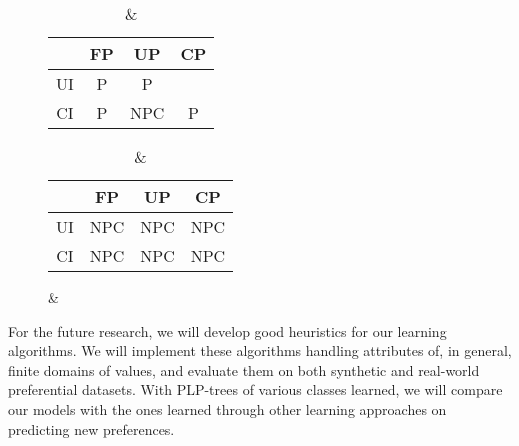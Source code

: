 \begin{table}[!ht]
	\centering
	\caption{Complexity results for passive learning problems}
  \begin{subfigure}[b]{0.45\textwidth}
		\centering
		\begin{tabular}[0.45\textwidth]{ | c | c | c | c | }
		  \hline
		     & FP & UP & CP \\
		  \hline
		  UI & P & P & \tit{NP}\\
		  \hline
		  CI & P & NPC & P  \\
		  \hline
		\end{tabular}
		\caption{}
		\label{tbl:cons_learn}
	\end{subfigure}%
  \begin{subfigure}[b]{0.45\textwidth}
		\centering
		\begin{tabular}[0.45\textwidth]{ | c | c | c | c | }
		  \hline
		     & FP & UP & CP \\
		  \hline
		  UI & NPC & NPC & NPC \\
		  \hline
		  CI & NPC & NPC & NPC \\
		  \hline
		\end{tabular}
		\caption{ \& }
		\label{tbl:small_max_learn}
	\end{subfigure}
	\label{tbl:comp_results}
\end{table}

For the future research, we will develop good heuristics for our learning algorithms.
We will implement these algorithms handling attributes of, in general, finite domains
of values, and evaluate them on both synthetic and
real-world preferential datasets. 
With PLP-trees of various classes learned, we will compare our models with
the ones learned through other learning approaches on predicting new preferences.
